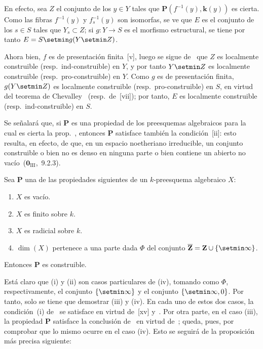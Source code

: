 En efecto, sea $Z$ el conjunto de los $y\in Y$ tales que $\boldsymbol{P}(f^{-1}(y),\boldsymbol{k}(y))$ es cierta.
Como las fibras $f^{-1}(y)$ y $f_s^{-1}(y)$ son isomorfas, se ve que $E$ es el conjunto de los $s\in S$ tales que $Y_s\subset Z$; si $g:Y\to S$ es el morfismo estructural, se tiene por tanto $E=S\setmin g(Y\setmin Z)$.


Ahora bien, $f$ es de presentación finita~[v], luego se sigue de~ que $Z$ es localmente construible (resp.\ ind-construible) en $Y$, y por tanto $Y\setmin Z$ es localmente construible (resp.\ pro-construible) en $Y$.
Como $g$ es de presentación finita, $g(Y\setmin Z)$ es localmente construible (resp.\ pro-construible) en $S$, en virtud del teorema de Chevalley~ (resp.\ de~[vii]); por tanto, $E$ es localmente construible (resp.\ ind-construible) en $S$.

\begin{remark}[9.2.5]
\label{IV.9.2.5}
Se señalará que, si $\boldsymbol{P}$ es una propiedad de los preesquemas algebraicos para la cual es cierta la prop.~, entonces $\boldsymbol{P}$ satisface también la condición~[ii]: esto resulta, en efecto, de que, en un espacio noetheriano irreducible, un conjunto construible o bien no es denso en ninguna parte o bien contiene un abierto no vacío~($\mathbf{0}_{\mathrm{III}}$,~9.2.3).
\end{remark}

\begin{proposition}[9.2.6]
\label{IV.9.2.6}
Sea $\boldsymbol{P}$ una de las propiedades siguientes de un $k$-preesquema algebraico $X$:
\begin{enumerate}[label=\textup{(\roman*)}]
  \item $X$ es vacío.
  \item $X$ es finito sobre $k$.
  \item $X$ es radicial sobre $k$.
  \item $\dim(X)$ pertenece a una parte dada $\Phi$ del conjunto $\overline{\mathbf Z}=\mathbf Z\cup\{\setmin\infty\}$.
\end{enumerate}
Entonces $\boldsymbol{P}$ es construible.
\end{proposition}

Está claro que (i) y (ii) son casos particulares de (iv), tomando como $\Phi$, respectivamente, el conjunto $\{\setmin\infty\}$ y el conjunto $\{\setmin\infty,0\}$.
Por tanto, solo se tiene que demostrar (iii) y (iv).
En cada uno de estos dos casos, la condición~(i) de~ se satisface en virtud de~[xv] y~.
Por otra parte, en el caso (iii), la propiedad $\boldsymbol{P}$ satisface la conclusión de~ en virtud de~; queda, pues, por comprobar que lo mismo ocurre en el caso (iv).
Esto se seguirá de la proposición más precisa siguiente:

